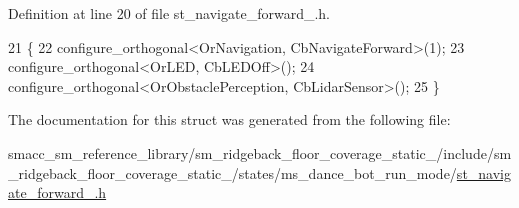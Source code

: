 Definition at line 20 of file st\+\_\+navigate\+\_\+forward\+\_.\+h.


\begin{DoxyCode}
21     \{
22       configure\_orthogonal<OrNavigation, CbNavigateForward>(1);
23       configure\_orthogonal<OrLED, CbLEDOff>();
24       configure\_orthogonal<OrObstaclePerception, CbLidarSensor>();
25     \}
\end{DoxyCode}


The documentation for this struct was generated from the following file\+:\begin{DoxyCompactItemize}
\item 
smacc\+\_\+sm\+\_\+reference\+\_\+library/sm\+\_\+ridgeback\+\_\+floor\+\_\+coverage\+\_\+static\+\_/include/sm\+\_\+ridgeback\+\_\+floor\+\_\+coverage\+\_\+static\+\_/states/ms\+\_\+dance\+\_\+bot\+\_\+run\+\_\+mode/\hyperlink{sm__ridgeback__floor__coverage__static__1_2include_2sm__ridgeback__floor__coverage__static__1_2scdbb10af836ac7a4ca09b8a84a0598fa}{st\+\_\+navigate\+\_\+forward\+\_.\+h}\end{DoxyCompactItemize}

